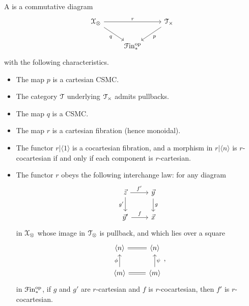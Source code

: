 \documentclass[main.tex]{subfiles}
\begin{document}
\begin{definition}
  A  is a commutative diagram
  \begin{equation*}
    \begin{tikzcd}
      \category{X}_{\otimes}
      \arrow[rr, "r"]
      \arrow[dr, swap, "q"]
      && \category{T}_{\times}
      \arrow[dl, "p"]
      \\
      & \Finp\op
    \end{tikzcd}
  \end{equation*}
  with the following characteristics.
  \begin{itemize}
    \item The map $p$ is a cartesian CSMC.

    \item The category $\mathcal{T}$ underlying $\mathcal{T}_{\times}$ admits pullbacks.

    \item The map $q$ is a CSMC.

    \item The map $r$ is a cartesian fibration (hence monoidal).

    \item The functor $r|\langle 1 \rangle$ is a cocartesian fibration, and a morphism in $r|\langle n \rangle$ is $r$-cocartesian if and only if each component is $r$-cartesian.

    \item The functor $r$ obeys the following interchange law: for any diagram
      \begin{equation*}
        \begin{tikzcd}
          \vec{z}
          \arrow[r, "f'"]
          \arrow[d, swap, "g'"]
          & \vec{y}
          \arrow[d, "g"]
          \\
          \vec{y}'
          \arrow[r, "f"]
          & \vec{x}
        \end{tikzcd}
      \end{equation*}
      in $\mathcal{X}_{\otimes}$ whose image in $\mathcal{T}_{\otimes}$ is pullback, and which lies over a square
      \begin{equation*}
        \begin{tikzcd}
          \langle n \rangle
          & \langle n \rangle
          \arrow[l, equals]
          \\
          \langle m \rangle
          \arrow[u, "\phi"]
          & \langle m \rangle
          \arrow[l, equals]
          \arrow[u, swap, "\psi"]
        \end{tikzcd},
      \end{equation*}
      in $\mathcal{F}\mathrm{in}_{*}^{\mathrm{op}}$, if $g$ and $g'$ are $r$-cartesian and $f$ is $r$-cocartesian, then $f'$ is $r$-cocartesian.
  \end{itemize}
\end{definition}
\end{document}
